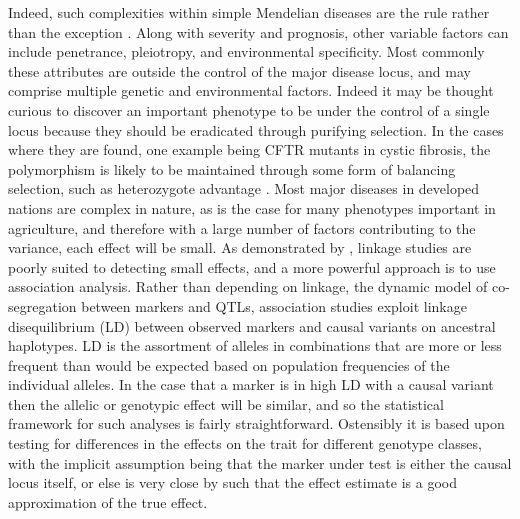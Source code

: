 Indeed, such complexities within simple Mendelian diseases are the rule rather than the exception \citep{Summers1996}. Along with severity and prognosis, other variable factors can include penetrance, pleiotropy, and environmental specificity. Most commonly these attributes are outside the control of the major disease locus, and may comprise multiple genetic and environmental factors. Indeed it may be thought curious to discover an important phenotype to be under the control of a single locus because they should be eradicated through purifying selection. In the cases where they are found, one example being CFTR mutants in cystic fibrosis, the polymorphism is likely to be maintained through some form of balancing selection, such as heterozygote advantage \citep{Jorde1988}. Most major diseases in developed nations are complex in nature, as is the case for many phenotypes important in agriculture, and therefore with a large number of factors contributing to the variance, each effect will be small. As demonstrated by \citet{Risch1996}, linkage studies are poorly suited to detecting small effects, and a more powerful approach is to use association analysis. Rather than depending on linkage, the dynamic model of co-segregation between markers and QTLs, association studies exploit linkage disequilibrium (LD) between observed markers and causal variants on ancestral haplotypes. LD is the assortment of alleles in combinations that are more or less frequent than would be expected based on population frequencies of the individual alleles. In the case that a marker is in high LD with a causal variant then the allelic or genotypic effect will be similar, and so the statistical framework for such analyses is fairly straightforward. Ostensibly it is based upon testing for differences in the effects on the trait for different genotype classes, with the implicit assumption being that the marker under test is either the causal locus itself, or else is very close by such that the effect estimate is a good approximation of the true effect.

